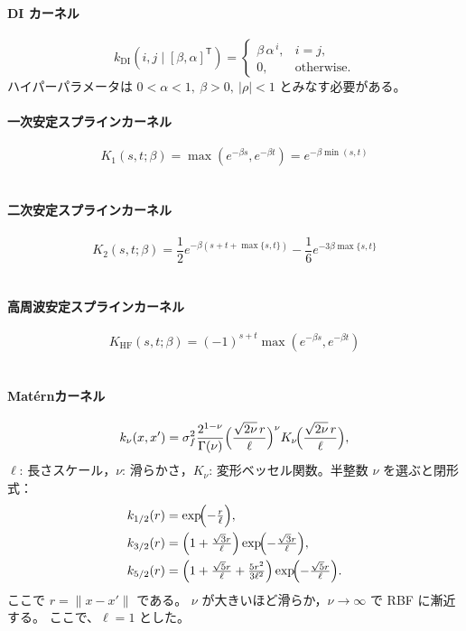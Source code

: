 \paragraph{DI カーネル}
\begin{equation}
  k_{\mathrm{DI}}\!\left(i,j \mid [\beta,\alpha]^{\mathsf T}\right)
  =
  \begin{cases}
    \beta\,\alpha^{\,i}, & i=j,\\
    0, & \text{otherwise}.
  \end{cases}
\end{equation}
ハイパーパラメータは \(0<\alpha<1,\ \beta>0,\ |\rho|<1\) とみなす必要がある。
\cite[式(17)]{337342}
\paragraph{一次安定スプラインカーネル}
\begin{equation}
  K_1(s,t;\beta) = \max(e^{-\beta s}, e^{-\beta t}) = e^{-\beta \min(s,t)}
\end{equation}
~\cite[式(10)]{6160606}
\paragraph{二次安定スプラインカーネル}

\begin{equation}
  K_2(s,t;\beta) = \frac{1}{2}e^{-\beta(s+t+\max\{s,t\})} - \frac{1}{6}e^{-3\beta\max\{s,t\}}
\end{equation}
~\cite[式(11)]{6160606}
\paragraph{高周波安定スプラインカーネル}
\begin{equation}
  K_{\mathrm{HF}}(s,t;\beta) = (-1)^{s+t}\max(e^{-\beta s}, e^{-\beta t})
\end{equation}
~\cite[式(14)]{6160606}
\paragraph{Matérnカーネル}
\[
k_{\nu}(x,x')=\sigma_f^2\frac{2^{1-\nu}}{\Gamma(\nu)}
\Bigl(\frac{\sqrt{2\nu}\,r}{\ell}\Bigr)^{\nu}
K_{\nu}\!\Bigl(\frac{\sqrt{2\nu}\,r}{\ell}\Bigr),
\]
$\ell$: 長さスケール，$\nu$: 滑らかさ，$K_{\nu}$: 変形ベッセル関数。半整数 $\nu$ を選ぶと閉形式：
\[
\begin{aligned}
k_{1/2}(r)&=\exp\!\Bigl(-\tfrac{r}{\ell}\Bigr),\\
k_{3/2}(r)&=\Bigl(1+\tfrac{\sqrt{3}r}{\ell}\Bigr)\exp\!\Bigl(-\tfrac{\sqrt{3}r}{\ell}\Bigr),\\
k_{5/2}(r)&=\Bigl(1+\tfrac{\sqrt{5}r}{\ell}+\tfrac{5r^{2}}{3\ell^{2}}\Bigr)\exp\!\Bigl(-\tfrac{\sqrt{5}r}{\ell}\Bigr).
\end{aligned}
\]
ここで $r = \|x - x'\|$ である。
$\nu$ が大きいほど滑らか，$\nu\to\infty$ で RBF に漸近する。
\cite[式(4.14), 式(4.16), 式(4.17)]{Rasmussen2004}
ここで、$\ell = 1$ とした。

